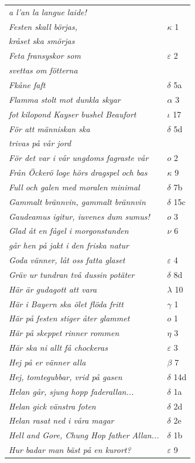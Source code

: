 \documentclass[a6paper,10pt]{article}
\begin{document}
\newpage
\begin{table}[!h]
\begin{tabular}{l l}
\textit{a l'an la langue laide!} &\\
\textit{Festen skall börjas,}	&$\kappa$ 1\\
\textit{kråset ska smörjas} &\\
\textit{Feta fransyskor som}	&$\varepsilon$ 2\\
\textit{svettas om fötterna} &\\
\textit{Fkåne faft}	&$\delta$ 5a\\
\textit{Flamma stolt mot dunkla skyar}	&$\alpha$ 3\\
\textit{fot kilopond Kayser bushel Beaufort}	&$\iota$ 17\\
\textit{För att människan ska}	&$\delta$ 5d\\
\textit{trivas på vår jord} &\\
\textit{För det var i vår ungdoms fagraste vår}	&$o$ 2\\
\textit{Från Öckerö loge hörs dragspel och bas}	&$\kappa$ 9\\
\textit{Full och galen med moralen minimal}	&$\delta$ 7b\\
\textit{Gammalt brännvin, gammalt brännvin}	&$\delta$ 15c\\
\textit{Gaudeamus igitur, iuvenes dum sumus!}	&$o$ 3\\
\textit{Glad åt en fågel i morgonstunden}	&$\nu$ 6\\
\textit{går hen på jakt i den friska natur} &\\
\textit{Goda vänner, låt oss fatta glaset}	&$\varepsilon$ 4\\
\textit{Gräv ur tundran två dussin potäter}	&$\delta$ 8d\\
\textit{Här är gudagott att vara}	&$\lambda$ 10\\
\textit{Här i Bayern ska ölet flöda fritt}	&$\gamma$ 1\\
\textit{Här på festen stiger åter glammet}	&$o$ 1\\
\textit{Här på skeppet rinner rommen}	&$\eta$ 3\\
\textit{Här ska ni allt få chockeras}	&$\varepsilon$ 3\\
\textit{Hej på er vänner alla}	&$\beta$ 7\\
\textit{Hej, tomtegubbar, vrid på gasen}	&$\delta$ 14d\\
\textit{Helan går, sjung hopp faderallan...}	&$\delta$ 1a\\
\textit{Helan gick  vänstra foten}	&$\delta$ 2d\\
\textit{Helan rasat ned i våra magar}	&$\delta$ 2e\\
\textit{Hell and Gore, Chung Hop father Allan...}	&$\delta$ 1b\\
\textit{Hur badar man bäst på en kurort?}	&$\varepsilon$ 9\\
\end{tabular}
\end{table}
\end{document}
